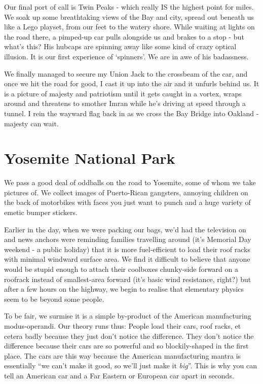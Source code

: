 \documentclass[a5paper,titlepage,11pt]{book}
\begin{document}
Our final port of call is Twin Peaks - which really IS the highest point for miles. We soak up some breathtaking views of the Bay and city, spread out beneath us like a Lego playset, from our feet to the watery shore. While waiting at lights on the road there, a pimped-up car pulls alongside us and brakes to a stop - but what's this?  His hubcaps are spinning away like some kind of crazy optical illusion. It is our first experience of `spinners'. We are in awe of his badassness.

We finally managed to secure my Union Jack to the crossbeam of the car, and once we hit the road for good, I cast it up into the air and it unfurls behind us. It is a picture of majesty and patriotism until it gets caught in a vortex, wraps around and threatens to smother Imran while he's driving at speed through a tunnel. I rein the wayward flag back in as we cross the Bay Bridge into Oakland - majesty can wait.

\section*{Yosemite National Park}
We pass a good deal of oddballs on the road to Yosemite, some of whom we take pictures of. We collect images of Puerto-Rican gangsters, annoying children on the back of motorbikes with faces you just want to punch and a huge variety of emetic bumper stickers.

Earlier in the day, when we were packing our bags, we'd had the television on and news anchors were reminding families travelling around (it's Memorial Day weekend - a public holiday) that it is more fuel-efficient to load their roof racks with minimal windward surface area. We find it difficult to believe that anyone would be stupid enough to attach their coolboxes chunky-side forward on a roofrack instead of smallest-area forward (it's basic wind resistance, right?) but after a few hours on the highway, we begin to realise that elementary physics seem to be beyond some people.

To be fair, we surmise it is a simple by-product of the American manufacturing modus-operandi. Our theory runs thus:  People load their cars, roof racks, et cetera badly because they just don't notice the difference. They don't notice the difference because their cars are so powerful and so blockily-shaped in the first place. The cars are this way because the American manufacturing mantra is essentially ``we can't make it good, so we'll just make it \emph{big}''. This is why you can tell an American car and a Far Eastern or European car apart in seconds.
\end{document}
